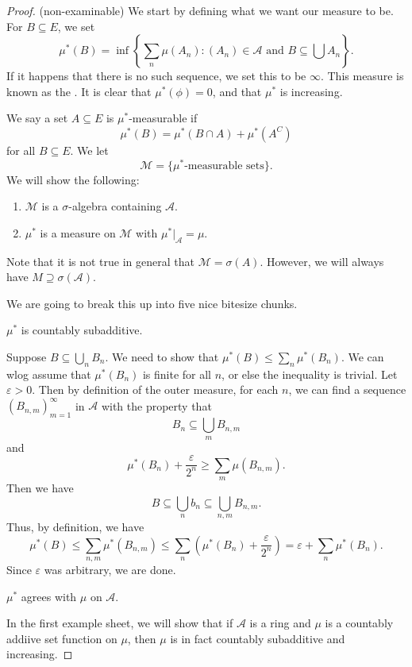 \documentclass[a4paper]{article}
\begin{document}
\begin{proof}(non-examinable)
  We start by defining what we want our measure to be. For $B \subseteq E$, we set
  \[
    \mu^*(B) = \inf\left\{\sum_n\mu(A_n): (A_n) \in \mathcal{A}\text{ and } B\subseteq \bigcup A_n\right\}.
  \]
  If it happens that there is no such sequence, we set this to be $\infty$. This measure is known as the . It is clear that $\mu^*(\phi) = 0$, and that $\mu^*$ is increasing.

  We say a set $A \subseteq E$ is $\mu^*$-measurable if
  \[
    \mu^*(B) = \mu^*(B \cap A) + \mu^*(A^C)
  \]
  for all $B \subseteq E$. We let
  \[
    \mathcal{M} = \{\text{$\mu^*$-measurable sets}\}.
  \]
  We will show the following:
  \begin{enumerate}
    \item $\mathcal{M}$ is a $\sigma$-algebra containing $\mathcal{A}$.
    \item $\mu^*$ is a measure on $\mathcal{M}$ with $\mu^*|_{\mathcal{A}} = \mu$.
  \end{enumerate}
  Note that it is not true in general that $\mathcal{M} = \sigma(A)$. However, we will always have $M \supseteq \sigma(\mathcal{A})$.

  We are going to break this up into five nice bitesize chunks.

  \begin{claim}
    $\mu^*$ is countably subadditive.
  \end{claim}
  Suppose $B\subseteq \bigcup_n B_n$. We need to show that $\mu^*(B) \leq \sum_n \mu^*(B_n)$. We can wlog assume that $\mu^*(B_n)$ is finite for all $n$, or else the inequality is trivial. Let $\varepsilon > 0$. Then by definition of the outer measure, for each $n$, we can find a sequence $(B_{n, m})_{m = 1}^\infty$ in $\mathcal{A}$ with the property that
  \[
    B_n \subseteq \bigcup_m B_{n, m}
  \]
  and
  \[
    \mu^*(B_n) + \frac{\varepsilon}{2^n} \geq \sum_m \mu(B_{n, m}).
  \]
  Then we have
  \[
    B \subseteq \bigcup_n b_n \subseteq \bigcup_{n, m}B_{n, m}.
  \]
  Thus, by definition, we have
  \[
    \mu^*(B) \leq \sum_{n, m}\mu^*(B_{n, m}) \leq \sum_n \left(\mu^*(B_n) + \frac{\varepsilon}{2^n}\right) = \varepsilon + \sum_n \mu^*(B_n).
  \]
  Since $\varepsilon$ was arbitrary, we are done.
  \begin{claim}
    $\mu^*$ agrees with $\mu$ on $\mathcal{A}$.
  \end{claim}
  In the first example sheet, we will show that if $\mathcal{A}$ is a ring and $\mu$ is a countably addiive set function on $\mu$, then $\mu$ is in fact countably subadditive and increasing.


\end{proof}
\end{document}
